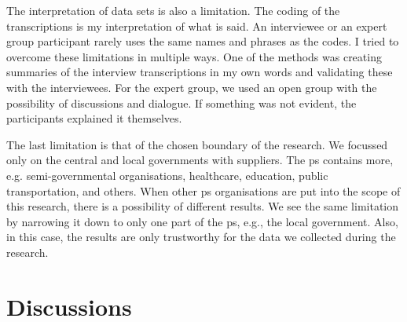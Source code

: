 The interpretation of data sets is also a limitation. The coding of the transcriptions is my interpretation of what is said. An interviewee or an expert group participant rarely uses the same names and phrases as the codes. I tried to overcome these limitations in multiple ways. One of the methods was creating summaries of the interview transcriptions in my own words and validating these with the interviewees. For the expert group, we used an open group with the possibility of discussions and dialogue. If something was not evident, the participants explained it themselves.

The last limitation is that of the chosen boundary of the research. We focussed only on the central and local governments with suppliers. The \gls{ps} contains more, e.g. semi-governmental organisations, healthcare, education, public transportation, and others. When other \gls{ps} organisations are put into the scope of this research, there is a possibility of different results. We see the same limitation by narrowing it down to only one part of the \gls{ps}, e.g., the local government. Also, in this case, the results are only trustworthy for the data we collected during the research.

\section{Discussions}
\label{sec:discussions}

